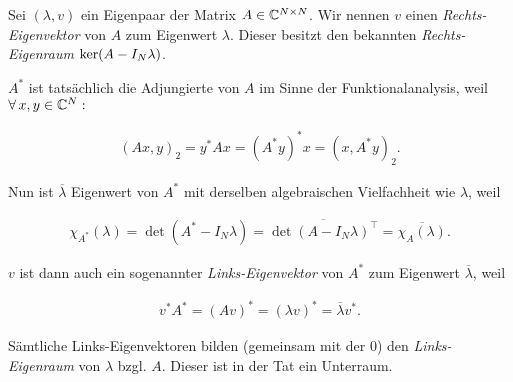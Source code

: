 \begin{remark}
    
    Sei $(\lambda, v)$ ein Eigenpaar der Matrix $A \in \mathbb{C}^{N \times N}$.
    Wir nennen $v$ einen \textit{Rechts-Eigenvektor} von $A$ zum Eigenwert $\lambda$.
    Dieser besitzt den bekannten \textit{Rechts-Eigenraum} $\operatorname{ker}(A - I_N \lambda)$.

    $A^\ast$ ist tatsächlich die Adjungierte von $A$ im Sinne der Funktionalanalysis, weil $\forall \, x, y \in \mathbb{C}^N:$

    \begin{align*}
        (A x, y)_2
        =
        y^\ast A x
        =
        (A^\ast y)^\ast x
        =
        (x, A^\ast y)_2.
    \end{align*}

    Nun ist $\overline \lambda$ Eigenwert von $A^\ast$ mit derselben algebraischen Vielfachheit wie $\lambda$, weil

    \begin{align*}
        \chi_{A^\ast}(\lambda)
        =
        \det(A^\ast - I_N \lambda)
        =
        \overline{\det(A - I_N \lambda)^\top}
        =
        \overline{\chi_A(\lambda)}.
    \end{align*}

    $v$ ist dann auch ein sogenannter \textit{Links-Eigenvektor} von $A^\ast$ zum Eigenwert $\overline \lambda$, weil

    \begin{align*}
        v^\ast A^\ast
        =
        (A v)^\ast
        =
        (\lambda v)^\ast
        =
        \overline \lambda v^\ast.
    \end{align*}

    Sämtliche Links-Eigenvektoren bilden (gemeinsam mit der $0$) den \textit{Links-Eigenraum} von $\lambda$ bzgl. $A$.
    Dieser ist in der Tat ein Unterraum.

\end{remark}

